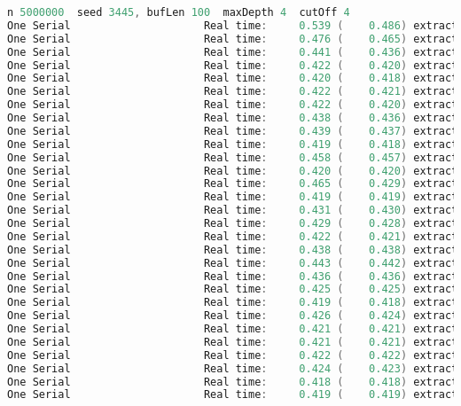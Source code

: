 \documentclass[format=acmsmall, review=false, screen=true]{acmart}
\begin{document}
\begin{lstlisting}[language=java]
n 5000000  seed 3445, bufLen 100  maxDepth 4  cutOff 4
One Serial                     Real time:     0.539 (    0.486) extract: 5000000
One Serial                     Real time:     0.476 (    0.465) extract: 2500000
One Serial                     Real time:     0.441 (    0.436) extract: 1666666
One Serial                     Real time:     0.422 (    0.420) extract: 1250000
One Serial                     Real time:     0.420 (    0.418) extract: 1000000
One Serial                     Real time:     0.422 (    0.421) extract: 833333
One Serial                     Real time:     0.422 (    0.420) extract: 714285
One Serial                     Real time:     0.438 (    0.436) extract: 625000
One Serial                     Real time:     0.439 (    0.437) extract: 555555
One Serial                     Real time:     0.419 (    0.418) extract: 500000
One Serial                     Real time:     0.458 (    0.457) extract: 454545
One Serial                     Real time:     0.420 (    0.420) extract: 416666
One Serial                     Real time:     0.465 (    0.429) extract: 384615
One Serial                     Real time:     0.419 (    0.419) extract: 357142
One Serial                     Real time:     0.431 (    0.430) extract: 333333
One Serial                     Real time:     0.429 (    0.428) extract: 312500
One Serial                     Real time:     0.422 (    0.421) extract: 294117
One Serial                     Real time:     0.438 (    0.438) extract: 277777
One Serial                     Real time:     0.443 (    0.442) extract: 263157
One Serial                     Real time:     0.436 (    0.436) extract: 250000
One Serial                     Real time:     0.425 (    0.425) extract: 238095
One Serial                     Real time:     0.419 (    0.418) extract: 227272
One Serial                     Real time:     0.426 (    0.424) extract: 217391
One Serial                     Real time:     0.421 (    0.421) extract: 208333
One Serial                     Real time:     0.421 (    0.421) extract: 200000
One Serial                     Real time:     0.422 (    0.422) extract: 192307
One Serial                     Real time:     0.424 (    0.423) extract: 185185
One Serial                     Real time:     0.418 (    0.418) extract: 178571
One Serial                     Real time:     0.419 (    0.419) extract: 172413
\end{lstlisting}
\end{document}
